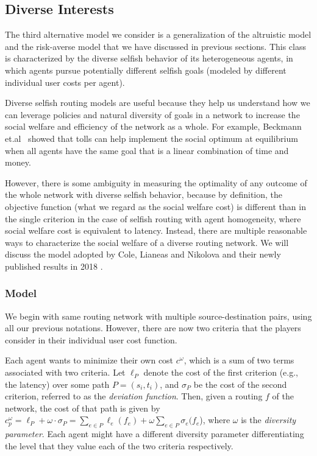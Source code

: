 \subsection{Diverse Interests}\label{sec:diversity}

The third alternative model we consider is a generalization of the altruistic model and the risk-averse model that we have discussed in previous sections. This class is characterized by the diverse selfish behavior of its heterogeneous agents, in which agents pursue potentially different selfish goals (modeled by different individual user costs per agent).%

Diverse selfish routing models are useful because they help us understand how we can leverage policies and natural diversity of goals in a network to increase the social welfare and efficiency of the network as a whole. For example, Beckmann et.al~\cite{beckmann1956studies} showed that tolls can help implement the social optimum at equilibrium when all agents have the same goal that is a linear combination of time and money.

However, there is some ambiguity in measuring the optimality of any outcome of the whole network with diverse selfish behavior, because by definition, the objective function (what we regard as the social welfare cost) is different than in the single criterion in the case of selfish routing with agent homogeneity, where social welfare cost is equivalent to latency. Instead, there are multiple reasonable ways to characterize the social welfare of a diverse routing network. We will discuss the model adopted by Cole, Lianeas and Nikolova and their newly published results in 2018 \cite{ijcai2018-24}.

\subsubsection{Model}

We begin with same routing network with multiple source-destination pairs, using all our previous notations. However, there are now two criteria that the players consider in their individual user cost function.

Each agent wants to minimize their own cost $c^\omega$, which is a sum of two terms associated with two criteria. Let $\ell_P$ denote the cost of the first criterion (e.g., the latency) over some path $P=(s_i, t_i)$, and $\sigma_P$ be the cost of the second criterion, referred to as the {\it deviation function}. Then, given a routing $f$ of the network, the cost of that path is given by $c^\omega_p = \ell_P+\omega\cdot \sigma_P=\sum_{e\in P} \ell_e(f_e)+ \omega\sum_{e\in P}\sigma_e(f_e$), where $\omega$ is the {\it diversity parameter}. Each agent might have a different diversity parameter differentiating the level that they value each of the two criteria respectively.

